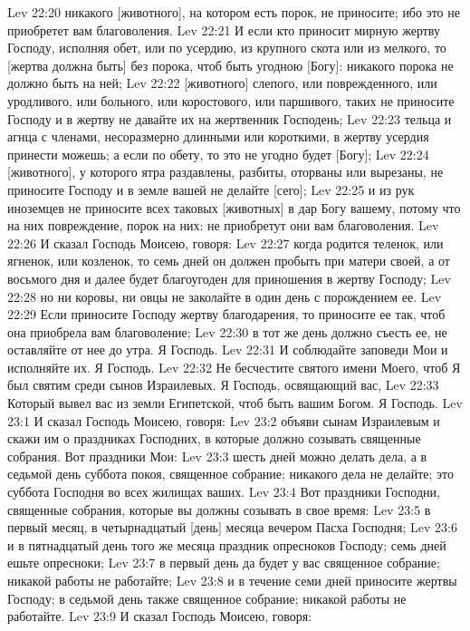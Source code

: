 Lev 22:20  никакого [животного], на котором есть порок, не приносите; ибо это не приобретет вам благоволения.
Lev 22:21  И если кто приносит мирную жертву Господу, исполняя обет, или по усердию, из крупного скота или из мелкого, то [жертва должна быть] без порока, чтоб быть угодною [Богу]: никакого порока не должно быть на ней;
Lev 22:22  [животного] слепого, или поврежденного, или уродливого, или больного, или коростового, или паршивого, таких не приносите Господу и в жертву не давайте их на жертвенник Господень;
Lev 22:23  тельца и агнца с членами, несоразмерно длинными или короткими, в жертву усердия принести можешь; а если по обету, то это не угодно будет [Богу];
Lev 22:24  [животного], у которого ятра раздавлены, разбиты, оторваны или вырезаны, не приносите Господу и в земле вашей не делайте [сего];
Lev 22:25  и из рук иноземцев не приносите всех таковых [животных] в дар Богу вашему, потому что на них повреждение, порок на них: не приобретут они вам благоволения.
Lev 22:26  И сказал Господь Моисею, говоря:
Lev 22:27  когда родится теленок, или ягненок, или козленок, то семь дней он должен пробыть при матери своей, а от восьмого дня и далее будет благоугоден для приношения в жертву Господу;
Lev 22:28  но ни коровы, ни овцы не заколайте в один день с порождением ее.
Lev 22:29  Если приносите Господу жертву благодарения, то приносите ее так, чтоб она приобрела вам благоволение;
Lev 22:30  в тот же день должно съесть ее, не оставляйте от нее до утра. Я Господь.
Lev 22:31  И соблюдайте заповеди Мои и исполняйте их. Я Господь.
Lev 22:32  Не бесчестите святого имени Моего, чтоб Я был святим среди сынов Израилевых. Я Господь, освящающий вас,
Lev 22:33  Который вывел вас из земли Египетской, чтоб быть вашим Богом. Я Господь.
Lev 23:1  И сказал Господь Моисею, говоря:
Lev 23:2  объяви сынам Израилевым и скажи им о праздниках Господних, в которые должно созывать священные собрания. Вот праздники Мои:
Lev 23:3  шесть дней можно делать дела, а в седьмой день суббота покоя, священное собрание; никакого дела не делайте; это суббота Господня во всех жилищах ваших.
Lev 23:4  Вот праздники Господни, священные собрания, которые вы должны созывать в свое время:
Lev 23:5  в первый месяц, в четырнадцатый [день] месяца вечером Пасха Господня;
Lev 23:6  и в пятнадцатый день того же месяца праздник опресноков Господу; семь дней ешьте опресноки;
Lev 23:7  в первый день да будет у вас священное собрание; никакой работы не работайте;
Lev 23:8  и в течение семи дней приносите жертвы Господу; в седьмой день также священное собрание; никакой работы не работайте.
Lev 23:9  И сказал Господь Моисею, говоря:
